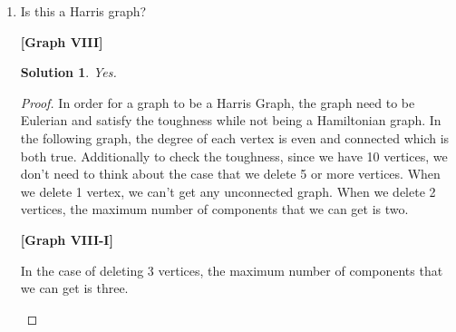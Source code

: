 \documentclass[11pt]{article}
\theoremstyle{solstyle}
\newtheorem*{solution}{Solution}
\newcommand{\glabel}[1]{\begin{center}\textbf{[Graph #1]}\end{center}}
\begin{document}
\begin{enumerate}[leftmargin=*]
\item Is this a Harris graph? 

\begin{center}
\end{center}
\glabel{VIII}
\begin{solution}
    Yes. 
\end{solution}
\begin{proof}
In order for a graph to be a Harris Graph, the graph need to be Eulerian and satisfy the toughness while not being a Hamiltonian graph. 
In the following graph, the degree of each vertex is even and connected which is both true. Additionally to check the toughness, since we have 10 vertices, we don’t need to think about the case that we delete 5 or more vertices.
When we delete 1 vertex, we can’t get any unconnected graph.
When we delete 2 vertices, the maximum number of components that we can get is two.

\begin{center}
\end{center}
\glabel{VIII-I}
In the case of deleting 3 vertices, the maximum number of components that we can get is three.

\begin{center}
\end{center}
\end{proof}
\end{enumerate}
\end{document}
